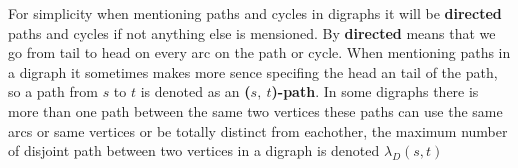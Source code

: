 For simplicity when mentioning paths and cycles in digraphs it will be \textbf{directed} paths and cycles if not anything else is mensioned. 
By \textbf{directed} means that we go from tail to head on every arc on the path or cycle.
When mentioning paths in a digraph it sometimes makes more sence specifing the head an tail of the path, so a path from $s$ to $t$ is denoted as an \textbf{($s,\ t$)-path}.
In some digraphs there is more than one path between the same two vertices these paths can use the same arcs or same vertices or be totally distinct from eachother, the maximum number of disjoint path between two vertices in a digraph is denoted $\lambda_D(s,t)$
 



